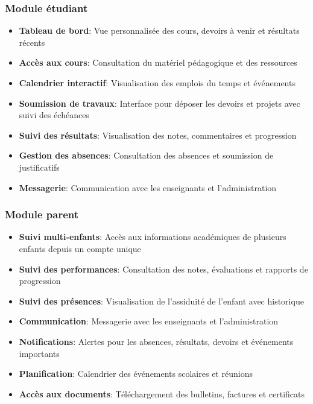 \subsubsection{Module étudiant}

\begin{itemize}
  \item \textbf{Tableau de bord}: Vue personnalisée des cours, devoirs à venir et résultats récents
  
  \item \textbf{Accès aux cours}: Consultation du matériel pédagogique et des ressources
  
  \item \textbf{Calendrier interactif}: Visualisation des emplois du temps et événements
  
  \item \textbf{Soumission de travaux}: Interface pour déposer les devoirs et projets avec suivi des échéances
  
  \item \textbf{Suivi des résultats}: Visualisation des notes, commentaires et progression
  
  \item \textbf{Gestion des absences}: Consultation des absences et soumission de justificatifs
  
  \item \textbf{Messagerie}: Communication avec les enseignants et l'administration
\end{itemize}

\subsubsection{Module parent}

\begin{itemize}
  \item \textbf{Suivi multi-enfants}: Accès aux informations académiques de plusieurs enfants depuis un compte unique
  
  \item \textbf{Suivi des performances}: Consultation des notes, évaluations et rapports de progression
  
  \item \textbf{Suivi des présences}: Visualisation de l'assiduité de l'enfant avec historique
  
  \item \textbf{Communication}: Messagerie avec les enseignants et l'administration
  
  \item \textbf{Notifications}: Alertes pour les absences, résultats, devoirs et événements importants
  
  \item \textbf{Planification}: Calendrier des événements scolaires et réunions
  
  \item \textbf{Accès aux documents}: Téléchargement des bulletins, factures et certificats
\end{itemize}

